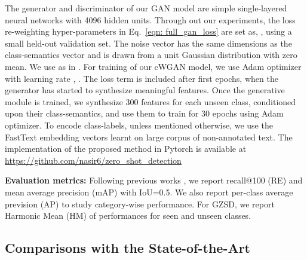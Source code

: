 \documentclass[runningheads]{llncs}
\begin{document}
The generator  and discriminator  of our GAN model are simple single-layered neural networks with {4096} hidden units. Through out our experiments, the loss re-weighting hyper-parameters in Eq.~\ref{eqn: full_gan_loss} are set as, , using a small held-out validation set. The noise vector  has the same dimensions as the class-semantics vector  and is drawn from a unit Gaussian distribution with zero mean. We use  as in \cite{gulrajani2017improved}. For training of our  cWGAN model, we use Adam optimizer with learning rate , . The loss term  is included after first  epochs, when the generator  has started to synthesize meaningful features. Once the generative module is trained, we synthesize 300 features for each unseen class, conditioned upon their class-semantics, and use them to train  for {30} epochs using {Adam} optimizer. To encode class-labels, unless mentioned otherwise, we use the FastText \cite{mikolov2018advances} embedding vectors learnt on large corpus of non-annotated text. The implementation of the proposed method in Pytorch is available at \url{https://github.com/nasir6/zero_shot_detection}

\noindent\textbf{Evaluation metrics:} Following previous works \cite{rahman2018polarity,bansal2018zero}, we report recall@100 (RE) and mean average precision (mAP) with IoU=0.5. We also report per-class average prevision (AP) to study category-wise performance. For GZSD, we report Harmonic Mean (HM) of performances for seen and unseen classes. 







\subsection{Comparisons with the State-of-the-Art}
\end{document}
